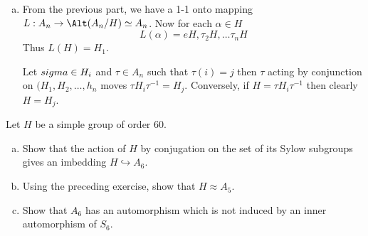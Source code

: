 \documentclass[12pt]{book}
\newcounter{myenumi}
\newenvironment{myenumerate}
{\begin{enumerate}
 \setcounter{enumi}{\themyenumi}
}
{\setcounter{myenumi}{\theenumi}
 \end{enumerate}}
\begin{document}
\begin{myenumerate}
\begin{enumerate}[(a)]
\item
From the previous part, we have a 1-1 onto mapping
 \(L: A_n \to \Alt(A_n/H)\simeq A_n\).
Now for each \(\alpha \in H\)
\begin{equation*}
 L(\alpha) = eH, \tau_2 H, \ldots \tau_n H
\end{equation*}
Thus \(L(H) = H_1\).

Let \(\\sigma \in H_i\) and \(\tau\in A_n\) such that \(\tau(i)=j\)
then \(\tau\) acting by conjunction on \((H_1,H_2,\ldots,h_n\)
moves \(\tau H_i \tau^{-1} = H_j\).
Conversely, if \(H = \tau H_i \tau^{-1}\) then clearly \(H = H_j\).
\end{enumerate}

\begin{excopy}
Let $H$ be a simple group of order \(60\).
\begin{enumerate}[(a)]
\item
Show that the action of $H$ by conjugation on the set of its Sylow subgroups
gives an imbedding \(H \hookrightarrow A_6\).
\item
Using the preceding exercise, show that \(H \approx A_5\).
\item
Show that \(A_6\) has an automorphism which is not induced by an inner
automorphism of \(S_6\).
\end{enumerate}
\end{excopy}

\begin{excopy}
\end{excopy}

\begin{excopy}
\end{excopy}

\end{myenumerate}




% 
\printindex

\end{document}
